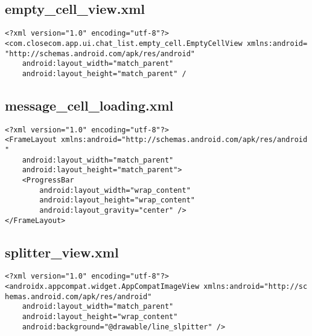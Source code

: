 \documentclass[listing]{espd}
\begin{document}
\subsection{empty\_cell\_view.xml}
\begin{verbatim}
<?xml version="1.0" encoding="utf-8"?>
<com.closecom.app.ui.chat_list.empty_cell.EmptyCellView xmlns:android=
"http://schemas.android.com/apk/res/android"
    android:layout_width="match_parent"
    android:layout_height="match_parent" /
\end{verbatim}

\subsection{message\_cell\_loading.xml}
\begin{verbatim}
<?xml version="1.0" encoding="utf-8"?>
<FrameLayout xmlns:android="http://schemas.android.com/apk/res/android
"
    android:layout_width="match_parent"
    android:layout_height="match_parent">
    <ProgressBar
        android:layout_width="wrap_content"
        android:layout_height="wrap_content"
        android:layout_gravity="center" />
</FrameLayout>
\end{verbatim}

\subsection{splitter\_view.xml}
\begin{verbatim}
<?xml version="1.0" encoding="utf-8"?>
<androidx.appcompat.widget.AppCompatImageView xmlns:android="http://sc
hemas.android.com/apk/res/android"
    android:layout_width="match_parent"
    android:layout_height="wrap_content"
    android:background="@drawable/line_slpitter" />
\end{verbatim}
\end{document}
